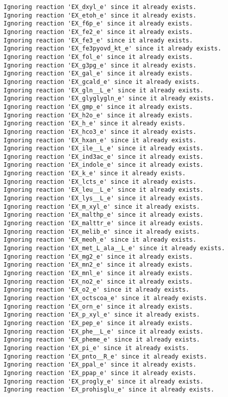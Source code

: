 \documentclass[
  letterpaper,
  DIV=11,
  numbers=noendperiod]{scrartcl}
\begin{document}
\begin{verbatim}
Ignoring reaction 'EX_dxyl_e' since it already exists.
Ignoring reaction 'EX_etoh_e' since it already exists.
Ignoring reaction 'EX_f6p_e' since it already exists.
Ignoring reaction 'EX_fe2_e' since it already exists.
Ignoring reaction 'EX_fe3_e' since it already exists.
Ignoring reaction 'EX_fe3pyovd_kt_e' since it already exists.
Ignoring reaction 'EX_fol_e' since it already exists.
Ignoring reaction 'EX_g3pg_e' since it already exists.
Ignoring reaction 'EX_gal_e' since it already exists.
Ignoring reaction 'EX_gcald_e' since it already exists.
Ignoring reaction 'EX_gln__L_e' since it already exists.
Ignoring reaction 'EX_glyglygln_e' since it already exists.
Ignoring reaction 'EX_gmp_e' since it already exists.
Ignoring reaction 'EX_h2o_e' since it already exists.
Ignoring reaction 'EX_h_e' since it already exists.
Ignoring reaction 'EX_hco3_e' since it already exists.
Ignoring reaction 'EX_hxan_e' since it already exists.
Ignoring reaction 'EX_ile__L_e' since it already exists.
Ignoring reaction 'EX_ind3ac_e' since it already exists.
Ignoring reaction 'EX_indole_e' since it already exists.
Ignoring reaction 'EX_k_e' since it already exists.
Ignoring reaction 'EX_lcts_e' since it already exists.
Ignoring reaction 'EX_leu__L_e' since it already exists.
Ignoring reaction 'EX_lys__L_e' since it already exists.
Ignoring reaction 'EX_m_xyl_e' since it already exists.
Ignoring reaction 'EX_malthp_e' since it already exists.
Ignoring reaction 'EX_malttr_e' since it already exists.
Ignoring reaction 'EX_melib_e' since it already exists.
Ignoring reaction 'EX_meoh_e' since it already exists.
Ignoring reaction 'EX_met_L_ala__L_e' since it already exists.
Ignoring reaction 'EX_mg2_e' since it already exists.
Ignoring reaction 'EX_mn2_e' since it already exists.
Ignoring reaction 'EX_mnl_e' since it already exists.
Ignoring reaction 'EX_no2_e' since it already exists.
Ignoring reaction 'EX_o2_e' since it already exists.
Ignoring reaction 'EX_octscoa_e' since it already exists.
Ignoring reaction 'EX_orn_e' since it already exists.
Ignoring reaction 'EX_p_xyl_e' since it already exists.
Ignoring reaction 'EX_pep_e' since it already exists.
Ignoring reaction 'EX_phe__L_e' since it already exists.
Ignoring reaction 'EX_pheme_e' since it already exists.
Ignoring reaction 'EX_pi_e' since it already exists.
Ignoring reaction 'EX_pnto__R_e' since it already exists.
Ignoring reaction 'EX_ppal_e' since it already exists.
Ignoring reaction 'EX_ppap_e' since it already exists.
Ignoring reaction 'EX_progly_e' since it already exists.
Ignoring reaction 'EX_prohisglu_e' since it already exists.

\end{verbatim}
\end{document}
